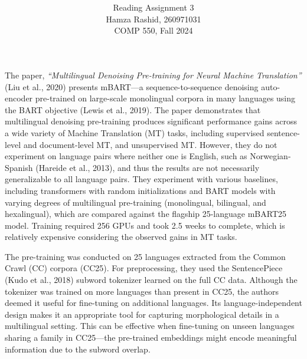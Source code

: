 \documentclass[11pt]{article}
\title{ }
\author{ Reading Assignment 3 \\ Hamza Rashid, 260971031 \\ COMP 550, Fall 2024}
\date{}
\begin{document}
\maketitle

\vspace{-5ex}
The paper, \textit{``Multilingual Denoising Pre-training for Neural Machine Translation''} (Liu et al., 2020) 
presents mBART---a sequence-to-sequence denoising
auto-encoder pre-trained on large-scale monolingual corpora 
in many languages using the BART objective (Lewis et al., 2019). 
The paper demonstrates that multilingual
denoising pre-training produces significant 
performance gains across a wide variety of
Machine Translation (MT) tasks, including supervised
sentence-level and document-level MT, 
and unsupervised MT. However, they do not experiment
on language pairs where neither one is English, such as Norwegian-Spanish (Hareide et al., 2013), and thus the results
are not necessarily generalizable to all language pairs. They experiment with various
baselines, including transformers with random initializations and BART models with varying degrees of multilingual
pre-training (monolingual, bilingual, and hexalingual), which are compared against the flagship 25-language mBART25 model. 
Training required 256 GPUs and took 2.5 weeks to complete, which is relatively expensive considering the observed gains in MT tasks.

The pre-training was conducted on 25 languages extracted from the Common Crawl (CC) corpora (CC25).
For preprocessing, they used the SentencePiece (Kudo et al., 2018)
subword tokenizer learned on the full CC data. 
Although the tokenizer was trained on more languages than present in CC25, 
the authors deemed it useful for fine-tuning on additional languages. Its language-independent
design makes it an appropriate tool for capturing morphological details in a multilingual setting. 
This can be effective when fine-tuning on unseen languages
sharing a family in CC25---the pre-trained embeddings might encode meaningful
information due to the subword overlap.
\end{document}
